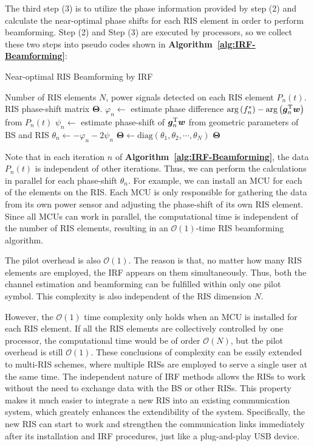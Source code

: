\documentclass[12pt,draftclsnofoot,journal,onecolumn]{IEEEtran}
\theoremstyle{nonumberplain}
\def \diag {\text{diag}}
\def \arg {\text{arg}}
\begin{document}
    The third step (3) is to utilize the phase information provided by step (2) and calculate the near-optimal phase shifts for each RIS element in order to perform beamforming. Step (2) and Step (3) are executed by processors, so we collect these two steps into pseudo codes shown in {\bf Algorithm~\ref{alg:IRF-Beamforming}}:
    \begin{algorithm}[H] 
        \caption{Near-optimal RIS Beamforming by IRF} \label{alg:IRF-Beamforming}
        \begin{algorithmic}[1]
            \REQUIRE Number of RIS elements $N$, power signals detected on each RIS element $P_n(t)$.
            \ENSURE RIS phase-shift matrix ${\bm \Theta}$.
                \STATE $\varphi_n \leftarrow$ estimate phase difference  $\arg\left(f_{n}^{*}\right)-\arg\left(\bm g_{n}^{\rm T}\bm w\right)$ from $P_n(t)$
                \STATE $\psi_{n} \leftarrow$ estimate phase-shift of $\bm g_{n}^{\rm T}\bm w$ from geometric parameters of BS and RIS
                \STATE $\theta_n \leftarrow -\varphi_n - 2\psi_n$
            \ENDFOR
            \STATE ${\bm \Theta} \leftarrow \diag(\theta_1, \theta_2, \cdots, \theta_N)$
            \RETURN ${\bm \Theta}$
        \end{algorithmic}
    \end{algorithm}
    Note that in each iteration $n$ of {\bf Algorithm~\ref{alg:IRF-Beamforming}}, the data $P_n(t)$ is independent of other iterations. Thus, we can perform the calculations in parallel for each phase-shift $\theta_n$. For example, we can install an MCU for each of the elements on the RIS. Each MCU is only responsible for gathering the data from its own power sensor and adjusting the phase-shift of its own RIS element. Since all MCUs can work in parallel, the computational time is independent of the number of RIS elements, resulting in an $\mathcal{O}(1)$-time RIS beamforming algorithm. 

    The pilot overhead is also $\mathcal{O}(1)$. The reason is that, no matter how many RIS elements are employed, the IRF appears on them simultaneously. Thus, both the channel estimation and beamforming can be fulfilled within only one pilot symbol. This complexity is also independent of the RIS dimension $N$. 

    However, the $\mathcal{O}(1)$ time complexity only holds when an MCU is installed for each RIS element. If all the RIS elements are collectively controlled by one processor, the computational time would be of order $\mathcal{O}(N)$, but the pilot overhead is still $\mathcal{O}(1)$. These conclusions of complexity can be easily extended to multi-RIS schemes, where multiple RISs are employed to serve a single user at the same time. The independent nature of IRF methods allows the RISs to work without the need to exchange data with the BS or other RISs. This property makes it much easier to integrate a new RIS into an existing communication system, which greately enhances the extendibility of the system. Specifically, the new RIS can start to work and strengthen the communication links immediately after its installation and IRF procedures, just like a plug-and-play USB device. 
\end{document}
